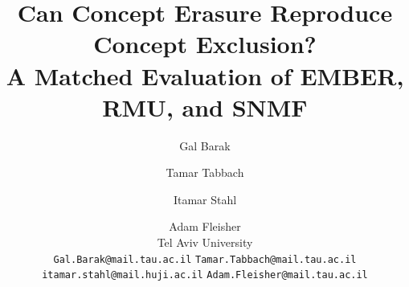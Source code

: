 \documentclass[11pt]{article}
\title{Can Concept Erasure Reproduce Concept Exclusion?\\
A Matched Evaluation of EMBER, RMU, and SNMF}
\author{
  Gal Barak \and Tamar Tabbach \and Itamar Stahl \and Adam Fleisher \\
  Tel Aviv University \\
  \texttt{Gal.Barak@mail.tau.ac.il} \quad
  \texttt{Tamar.Tabbach@mail.tau.ac.il} \\
  \texttt{itamar.stahl@mail.huji.ac.il} \quad
  \texttt{Adam.Fleisher@mail.tau.ac.il}
}
\begin{document}
\maketitle
\begin{abstract}

\end{abstract}











\clearpage
\appendix

\end{document}

